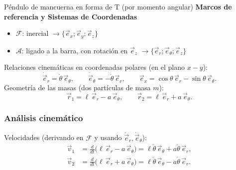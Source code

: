 \begin{solucion}{Péndulo de mancuerna en forma de T (por momento angular)}
\textbf{Marcos de referencia y Sistemas de Coordenadas}
\begin{itemize}
    \item $\mathcal{F}$: inercial $\longrightarrow\{\vec{e}_x;\vec{e}_y;\vec{e}_z\}$
    \item $\mathcal{A}$: ligado a la barra, con rotación en $\vec{e}_z$ $\longrightarrow\{\vec{e}_r;\vec{e}_\theta;\vec{e}_z\}$
\end{itemize}

\begin{center}
\end{center}

Relaciones cinemáticas en coordenadas polares (en el plano $x\!-\!y$):
$$\dot{\vec{e}}_r=\dot\theta\,\vec{e}_\theta,\qquad \dot{\vec{e}}_\theta=-\dot\theta\,\vec{e}_r,\qquad \vec{e}_x=\cos\theta\,\vec{e}_r-\sin\theta\,\vec{e}_\theta .$$
Geometría de las masas (dos partículas de masa $m$):
$$\vec{r}_1= \ell\,\vec{e}_r - a\,\vec{e}_\theta, \qquad \vec{r}_2= \ell\,\vec{e}_r + a\,\vec{e}_\theta .$$

\subsubsection*{Análisis cinemático}
Velocidades (derivando en $\mathcal{F}$ y usando $\dot{\vec{e}}_r,\dot{\vec{e}}_\theta$):
$$\begin{aligned}
\vec{v}_1 &= \frac{d}{dt}\big(\ell\,\vec{e}_r - a\,\vec{e}_\theta\big) = \ell\dot\theta\,\vec{e}_\theta + a\dot\theta\,\vec{e}_r,\\[2mm]
\vec{v}_2 &= \frac{d}{dt}\big(\ell\,\vec{e}_r + a\,\vec{e}_\theta\big) = \ell\dot\theta\,\vec{e}_\theta - a\dot\theta\,\vec{e}_r.
\end{aligned}$$


\end{solucion}
